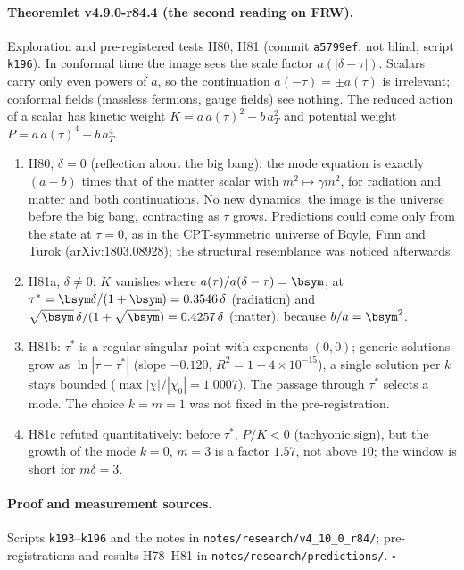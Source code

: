 \paragraph{Theoremlet v4.9.0-r84.4 (the second reading on FRW).}
Exploration and pre-registered tests H80, H81 (commit \texttt{a5799ef}, not blind; script \texttt{k196}).  In conformal time the image sees
the scale factor \(a(|\delta-\tau|)\).  Scalars carry only even powers of \(a\), so the continuation \(a(-\tau)=\pm a(\tau)\) is irrelevant;
conformal fields (massless fermions, gauge fields) see nothing.  The reduced action of a scalar has kinetic weight
\(K=a\,a(\tau)^2-b\,a_T^2\) and potential weight \(P=a\,a(\tau)^4+b\,a_T^4\).
\begin{enumerate}[leftmargin=2em]
\item[(a)] H80, \(\delta=0\) (reflection about the big bang): the mode equation is exactly \((a-b)\) times that of the matter scalar with
\(m^2\mapsto\gamma m^2\), for radiation and matter and both continuations.  No new dynamics; the image is the universe before the big bang,
contracting as \(\tau\) grows.  Predictions could come only from the state at \(\tau=0\), as in the CPT-symmetric universe of Boyle, Finn and
Turok (arXiv:1803.08928); the structural resemblance was noticed afterwards.
\item[(b)] H81a, \(\delta\neq0\): \(K\) vanishes where \(a(\tau)/a(\delta-\tau)=\bsym\), at \(\tau^*=\bsym\delta/(1+\bsym)=0.3546\,\delta\) (radiation) and
\(\sqrt\bsym\,\delta/(1+\sqrt\bsym)=0.4257\,\delta\) (matter), because \(b/a=\bsym^2\).
\item[(c)] H81b: \(\tau^*\) is a regular singular point with exponents \((0,0)\); generic solutions grow as \(\ln|\tau-\tau^*|\) (slope \(-0.120\),
\(R^2=1-4\times10^{-15}\)), a single solution per \(k\) stays bounded (\(\max|\chi|/|\chi_0|=1.0007\)).  The passage through \(\tau^*\) selects a
mode.  The choice \(k=m=1\) was not fixed in the pre-registration.
\item[(d)] H81c refuted quantitatively: before \(\tau^*\), \(P/K<0\) (tachyonic sign), but the growth of the mode \(k=0\), \(m=3\) is a factor
\(1.57\), not above \(10\); the window is short for \(m\delta=3\).
\end{enumerate}

\paragraph{Proof and measurement sources.}
Scripts \texttt{k193}--\texttt{k196} and the notes in \texttt{notes/\allowbreak research/\allowbreak v4\_10\_0\_r84/}; pre-registrations and results
H78--H81 in \texttt{notes/\allowbreak research/\allowbreak predictions/}.  \(\square\)

